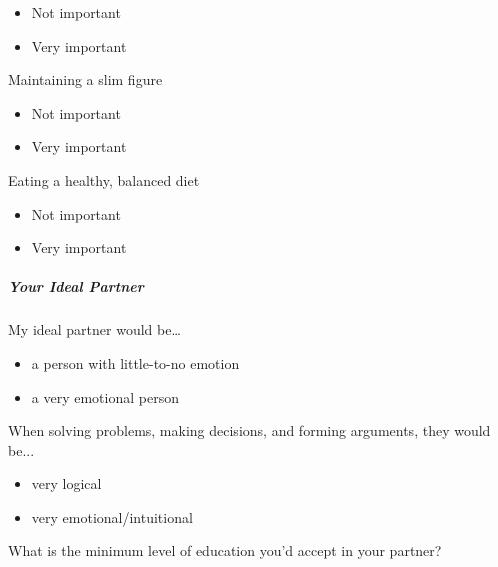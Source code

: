 \documentclass[twoside]{report}
\begin{document}
\begin{multicols*}{2}
\begin{multicols}{2}
\begin{itemize}
\item
  Not important
\end{itemize}

\begin{itemize}
\item
  Very important
\end{itemize}

Maintaining a slim figure

\begin{itemize}
\item
  Not important
\end{itemize}

\begin{itemize}
\item
  Very important
\end{itemize}

Eating a healthy, balanced diet

\begin{itemize}
\item
  Not important
\end{itemize}

\begin{itemize}
\item
  Very important
\end{itemize}

\subparagraph{Your Ideal Partner}

My ideal partner would be\ldots{}

\begin{itemize}
\item
  a person with little-to-no emotion
\end{itemize}

\begin{itemize}
\item
  a very emotional person
\end{itemize}

When solving problems, making decisions, and forming arguments, they
would be...

\begin{itemize}
\item
  very logical
\end{itemize}

\begin{itemize}
\item
  very emotional/intuitional
\end{itemize}

What is the minimum level of education you'd accept in your partner?


\end{multicols}
\end{multicols*}
\end{document}
